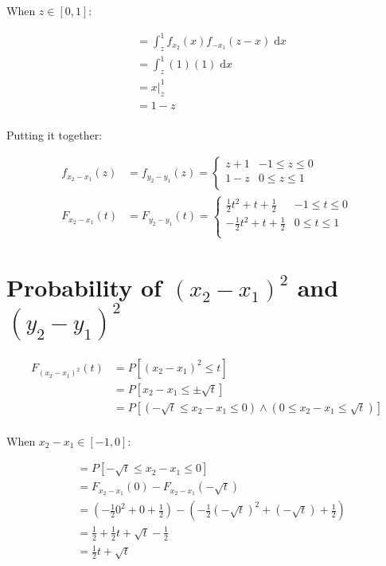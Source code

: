\documentclass{article}
\newcommand{\dx}{{\; \mathrm{d}x}}
\begin{document}
When $z \in [0, 1]$:

\begin{align*}
&= \int_{z}^{1} f_{x_2}(x)f_{-x_1}(z - x) \dx \\
&= \int_{z}^{1} (1)(1) \dx \\
&= x \Big|_{z}^{1} \\
&= 1 - z \\
\end{align*}

Putting it together:

\begin{align*}
f_{x_2 - x_1}(z) &= f_{y_2 - y_1}(z) =
\begin{cases}
    z + 1 & -1 \leq z \leq 0 \\
    1 - z & 0 \leq z \leq 1 \\
\end{cases}
\\
F_{x_2 - x_1}(t) &= F_{y_2 - y_1}(t) =
\begin{cases}
    \frac{1}{2}t^2 + t + \frac{1}{2}  & -1 \leq t \leq 0 \\
    -\frac{1}{2}t^2 + t + \frac{1}{2} & 0 \leq t \leq 1 \\
\end{cases}
\end{align*}

\section{Probability of $(x_2 - x_1)^2$ and $(y_2 - y_1)^2$}

\begin{align*}
F_{(x_2 - x_1)^2}(t)
&= P \left[ (x_2 - x_1)^2 \leq t \right] \\
&= P \left[ x_2 - x_1 \leq \pm \sqrt{t} \right] \\
&= P \left[ \left( -\sqrt{t} \leq x_2 - x_1 \leq 0 \right) \land \left( 0 \leq x_2 - x_1 \leq \sqrt{t} \right) \right] \\
\end{align*}

When $x_2 - x_1 \in [-1, 0]$:

\begin{align*}
&= P \left[ -\sqrt{t} \leq x_2 - x_1 \leq 0 \right] \\
&= F_{x_2 - x_1}(0) - F_{x_2 - x_1}(-\sqrt{t}) \\
&= \left( -\frac{1}{2}0^2 + 0 + \frac{1}{2} \right) - \left( -\frac{1}{2}(-\sqrt{t})^2 + (-\sqrt{t}) + \frac{1}{2} \right) \\
&= \frac{1}{2} + \frac{1}{2}t + \sqrt{t} - \frac{1}{2} \\
&= \frac{1}{2}t + \sqrt{t} \\
\end{align*}
\end{document}
